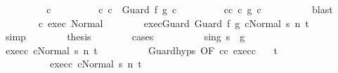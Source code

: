 \begin{isabellebody}
\ \ \ \ \ \ \isamarkupfalse%
\ \isamarkupfalse%
\ c{\isacharprime}{\isacharprime}\ \isanewline
\ \ \ \ \ \ \ \ c{\isacharcolon}\ {\isachardoublequoteopen}c\ {\isacharequal}\ Guard\ f{\isacharprime}\ g{\isacharprime}\ c{\isacharprime}{\isacharprime}{\isachardoublequoteclose}\ \isanewline
\ \ \ \ \ \ \ \ c{\isacharprime}{\isacharprime}{\isacharunderscore}c{\isacharprime}{\isacharcolon}\ {\isachardoublequoteopen}c{\isacharprime}{\isacharprime}\ {\isasymsubseteq}\isactrlsub g\ c{\isacharprime}{\isachardoublequoteclose}\isanewline
\ \ \ \ \ \ \ \ \isamarkupfalse%
\ blast\isanewline
\ \ \ \ \ \ \isamarkupfalse%
\ c\ exec\ Normal\isanewline
\ \ \ \ \ \ \isamarkupfalse%
\ exec{\isacharunderscore}Guard{\isacharprime}{\isacharcolon}\ {\isachardoublequoteopen}{\isasymGamma}{\isasymturnstile}{\isasymlangle}Guard\ f{\isacharprime}\ g{\isacharprime}\ c{\isacharprime}{\isacharprime}{\isacharcomma}Normal\ s{\isacharprime}{\isasymrangle}\ {\isacharequal}n{\isasymRightarrow}\ t{\isachardoublequoteclose}\isanewline
\ \ \ \ \ \ \ \ \isamarkupfalse%
\ simp\isanewline
\ \ \ \ \ \ \isamarkupfalse%
\ {\isacharquery}thesis\isanewline
\ \ \ \ \ \ \isamarkupfalse%
\ {\isacharparenleft}cases{\isacharparenright}\isanewline
\ \ \ \ \ \ \ \ \isamarkupfalse%
\ s{\isacharprime}{\isacharunderscore}in{\isacharunderscore}g{\isacharprime}{\isacharcolon}\ {\isachardoublequoteopen}s{\isacharprime}\ {\isasymin}\ g{\isacharprime}{\isachardoublequoteclose}\isanewline
\ \ \ \ \ \ \ \ \isamarkupfalse%
\ exec{\isacharunderscore}c{\isacharprime}{\isacharprime}{\isacharcolon}\ {\isachardoublequoteopen}{\isasymGamma}{\isasymturnstile}{\isasymlangle}c{\isacharprime}{\isacharprime}{\isacharcomma}Normal\ s{\isacharprime}{\isasymrangle}\ {\isacharequal}n{\isasymRightarrow}\ t{\isachardoublequoteclose}\isanewline
\ \ \ \ \ \ \ \ \isamarkupfalse%
\ Guard{\isachardot}hyps\ {\isacharbrackleft}OF\ c{\isacharprime}{\isacharprime}{\isacharunderscore}c{\isacharprime}\ exec{\isacharunderscore}c{\isacharprime}{\isacharprime}{\isacharbrackright}\ \ \isamarkupfalse%
\ t{\isacharprime}\ \isanewline
\ \ \ \ \ \ \ \ \ \ exec{\isacharunderscore}c{\isacharprime}{\isacharcolon}\ {\isachardoublequoteopen}{\isasymGamma}{\isasymturnstile}{\isasymlangle}c{\isacharprime}{\isacharcomma}Normal\ s{\isacharprime}{\isasymrangle}\ {\isacharequal}n{\isasymRightarrow}\ t{\isacharprime}{\isachardoublequoteclose}\ \isanewline

\end{isabellebody}
